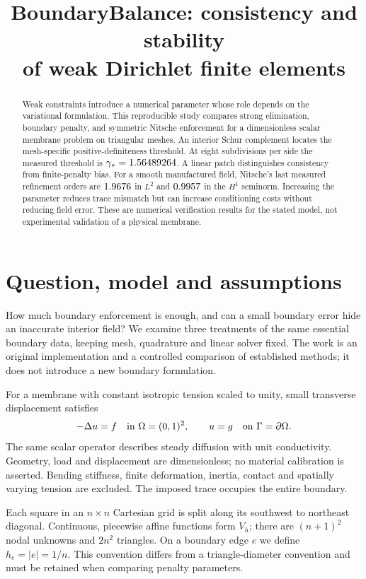 \documentclass[11pt,a4paper]{article}
\title{BoundaryBalance: consistency and stability\protect\\of weak Dirichlet finite elements}
\author{}
\date{}
\begin{document}
\maketitle
\vspace{-15mm}
\begin{abstract}
Weak constraints introduce a numerical parameter whose role depends on the
variational formulation. This reproducible study compares strong elimination,
boundary penalty, and symmetric Nitsche enforcement for a dimensionless scalar
membrane problem on triangular meshes. An interior Schur complement locates the
mesh-specific positive-definiteness threshold. At eight subdivisions per side
the measured threshold is $\gamma_*=1.56489264$. A linear patch distinguishes
consistency from finite-penalty bias. For a smooth manufactured field, Nitsche's
last measured refinement orders are $1.9676$ in $L^2$ and $0.9957$ in the
$H^1$ seminorm. Increasing the parameter reduces trace mismatch but can increase
conditioning costs without reducing field error. These are numerical verification
results for the stated model, not experimental validation of a physical membrane.
\end{abstract}

\section{Question, model and assumptions}
How much boundary enforcement is enough, and can a small boundary error hide an
inaccurate interior field? We examine three treatments of the same essential
boundary data, keeping mesh, quadrature and linear solver fixed. The work is an
original implementation and a controlled comparison of established methods;
it does not introduce a new boundary formulation.

For a membrane with constant isotropic tension scaled to unity, small transverse
displacement satisfies
\begin{equation}
 -\Delta u=f\quad\hbox{in }\Omega=(0,1)^2,\qquad
 u=g\quad\hbox{on }\Gamma=\partial\Omega .
 \label{eq:model}
\end{equation}
The same scalar operator describes steady diffusion with unit conductivity.
Geometry, load and displacement are dimensionless; no material calibration is
asserted. Bending stiffness, finite deformation, inertia, contact and spatially
varying tension are excluded. The imposed trace occupies the entire boundary.

Each square in an $n\times n$ Cartesian grid is split along its southwest to
northeast diagonal. Continuous, piecewise affine functions form $V_h$; there are
$(n+1)^2$ nodal unknowns and $2n^2$ triangles. On a boundary edge $e$ we define
$h_e=|e|=1/n$. This convention differs from a triangle-diameter convention and
must be retained when comparing penalty parameters.
\end{document}
